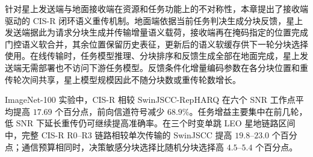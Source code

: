针对星上发送端与地面接收端在资源和任务功能上的不对称性，本章提出了接收端驱动的 CIS-R 闭环语义重传机制。地面端依据当前任务判决生成分块反馈，星上发送端据此为请求分块生成并传输增量语义载荷，接收端再在掩码指定的位置完成门控语义软合并，其余位置保留历史表征，更新后的语义软缓存供下一轮分块选择使用。在线传输时，任务模型推理、分块排序和反馈生成全部在地面完成，星上发送端无需部署也不访问下游任务模型。反馈条件化增量编码参数在各分块位置和重传轮次间共享，星上模型规模因此不随分块数或重传轮数增长。

ImageNet-100 实验中，CIS-R 相较 SwinJSCC-RepHARQ 在六个 SNR 工作点平均提高 $17.69$ 个百分点，前向信道符号减少 $68.9\%$。任务增益主要集中在前几轮，低 SNR 下延长重传仍可继续提高准确率。在三个时变单跳 LEO 星地链路区间中，完整 CIS-R R0--R3 链路相较单次传输的 SwinJSCC 提高 $19.8$--$23.0$ 个百分点；通信预算相同时，决策敏感分块选择比随机分块选择高 $4.5$--$5.4$ 个百分点。
